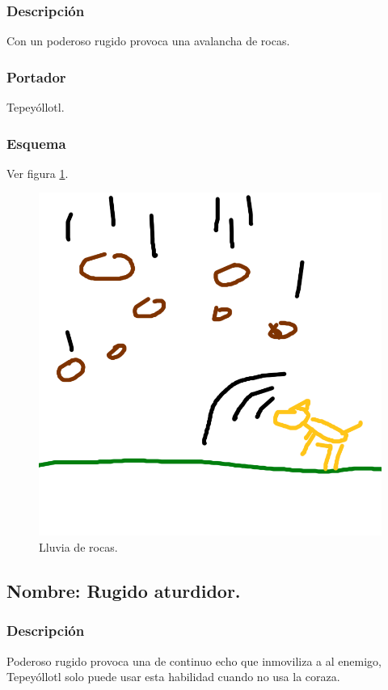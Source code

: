 \documentclass[11pt,letterpaper]{article}
\begin{document}
\subsubsection{Descripción}
Con un poderoso rugido provoca una avalancha de rocas. 
\subsubsection{Portador}
Tepeyóllotl.
\subsubsection{Esquema}
			Ver figura \ref{fig:lluviaR}.
			\begin{figure}
				\centering
				\includegraphics[height=0.2 \textheight]{Imagenes/lluviaR}
				\caption{Lluvia de rocas.}
				\label{fig:lluviaR}
			\end{figure}
\subsection{Nombre: Rugido aturdidor.}
\subsubsection{Descripción}
Poderoso rugido provoca una de continuo echo que inmoviliza a al enemigo, Tepeyóllotl solo puede usar esta habilidad cuando no usa la coraza. 
\end{document}
